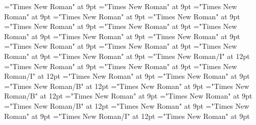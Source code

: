 \documentclass[gps1,twoside]{article}
\begin{document}
\font\spanreverseabbrvariantentrytypevariantentrytypesvariantformentrybackrefvariantformentrybackrefsentrylastchildafter="Times New Roman" at 9pt
\font\spanspanheadwordvariantformentrybackrefvariantformentrybackrefsentrybefore="Times New Roman" at 9pt
\font\spanspanowningentrysummarydefinitionvariantformentrybackrefvariantformentrybackrefsentrybefore="Times New Roman" at 9pt
\font\spanowningentrysummarydefinitionvariantformentrybackrefvariantformentrybackrefsentrylastchildafter="Times New Roman" at 9pt
\font\etymologyentrybefore="Times New Roman" at 9pt
\font\etymologyentryafter="Times New Roman" at 9pt
\font\spanspanformetymologyentrybefore="Times New Roman" at 9pt
\font\spanformetymologyentrylastchildafter="Times New Roman" at 9pt
\font\spanspanglossetymologyentrybefore="Times New Roman" at 9pt
\font\spanglossetymologyentrylastchildafter="Times New Roman" at 9pt
\font\spanspancommentetymologyentrybefore="Times New Roman" at 9pt
\font\spancommentetymologyentrylastchildafter="Times New Roman" at 9pt
\font\spanspanminimallexreferencesentrybefore="Times New Roman" at 9pt
\font\minimallexreferencesentryafter="Times New Roman" at 9pt
\font\spanenownertypeabbreviationminimallexreferenceminimallexreferencesentry="Times New Roman/I" at 12pt
\font\spanspanownertypeabbreviationminimallexreferenceminimallexreferencesentrybefore="Times New Roman" at 9pt
\font\spanownertypeabbreviationminimallexreferenceminimallexreferencesentrylastchildafter="Times New Roman" at 9pt
\font\spanownertypeabbreviationminimallexreferenceminimallexreferencesentry="Times New Roman/I" at 12pt
\font\configtargetconfigtargetconfigtargetsminimallexreferenceminimallexreferencesentrybefore="Times New Roman" at 9pt
\font\configtargetsminimallexreferenceminimallexreferencesentryafter="Times New Roman" at 9pt
\font\spanbzhheadwordconfigtargetconfigtargetsminimallexreferenceminimallexreferencesentry="Times New Roman/B" at 12pt
\font\spanspanheadwordconfigtargetconfigtargetsminimallexreferenceminimallexreferencesentrybefore="Times New Roman" at 9pt
\font\spanheadwordconfigtargetconfigtargetsminimallexreferenceminimallexreferencesentry="Times New Roman/B" at 12pt
\font\spanspansensecontentspansensesentrybefore="Times New Roman" at 9pt
\font\sensesentryafter="Times New Roman" at 9pt
\font\sensenumbersensecontentsensesentry="Times New Roman/B" at 12pt
\font\sensenumbersensecontentsensesentryafter="Times New Roman" at 9pt
\font\morphosyntaxanalysissharedgrammaticalinfosensesentryafter="Times New Roman" at 9pt
\font\morphosyntaxanalysissharedgrammaticalinfosensesentry="Times New Roman/I" at 12pt
\font\spanspanpartofspeechmorphosyntaxanalysissharedgrammaticalinfosensesentrybefore="Times New Roman" at 9pt
\end{document}
